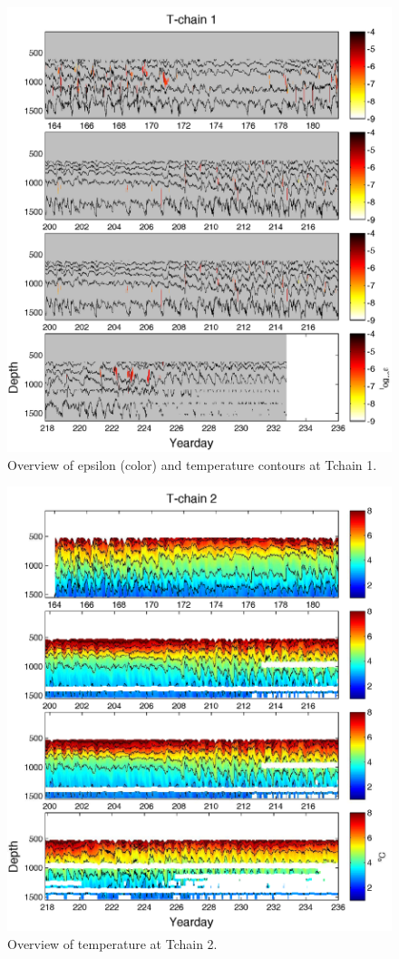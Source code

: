 \documentclass[11pt]{article}
\begin{document}
\begin{figure}[htbp]
\includegraphics[scale=0.9]{Tchain1_EpsilonOverview.pdf}
\caption{Overview of epsilon (color) and temperature contours at Tchain 1.}
\label{}
\end{figure}


\begin{figure}[htbp]
\includegraphics[scale=0.9]{Tchain2_TempOverview.pdf}
\caption{Overview of temperature at Tchain 2.}
\label{}
\end{figure}
\end{document}
